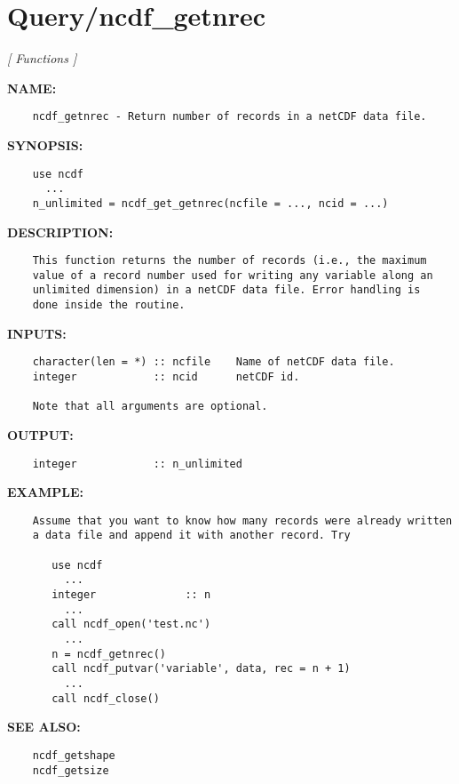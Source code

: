 \section{Query/ncdf\_getnrec}
\textsl{[ Functions ]}

\label{ch:robo92}
\label{ch:Query_ncdf_getnrec}
\textbf{NAME:}\hspace{0.08in}\begin{Verbatim}
    ncdf_getnrec - Return number of records in a netCDF data file.
\end{Verbatim}
\textbf{SYNOPSIS:}\hspace{0.08in}\begin{Verbatim}
    use ncdf
      ...
    n_unlimited = ncdf_get_getnrec(ncfile = ..., ncid = ...)
\end{Verbatim}
\textbf{DESCRIPTION:}\hspace{0.08in}\begin{Verbatim}
    This function returns the number of records (i.e., the maximum
    value of a record number used for writing any variable along an
    unlimited dimension) in a netCDF data file. Error handling is
    done inside the routine.
\end{Verbatim}
\textbf{INPUTS:}\hspace{0.08in}\begin{Verbatim}
    character(len = *) :: ncfile    Name of netCDF data file.
    integer            :: ncid      netCDF id.

    Note that all arguments are optional.
\end{Verbatim}
\textbf{OUTPUT:}\hspace{0.08in}\begin{Verbatim}
    integer            :: n_unlimited
\end{Verbatim}
\textbf{EXAMPLE:}\hspace{0.08in}\begin{Verbatim}
    Assume that you want to know how many records were already written
    a data file and append it with another record. Try

       use ncdf
         ...
       integer              :: n
         ...
       call ncdf_open('test.nc')
         ...
       n = ncdf_getnrec()
       call ncdf_putvar('variable', data, rec = n + 1)
         ...
       call ncdf_close()
\end{Verbatim}
\textbf{SEE ALSO:}\hspace{0.08in}\begin{Verbatim}
    ncdf_getshape
    ncdf_getsize
\end{Verbatim}
